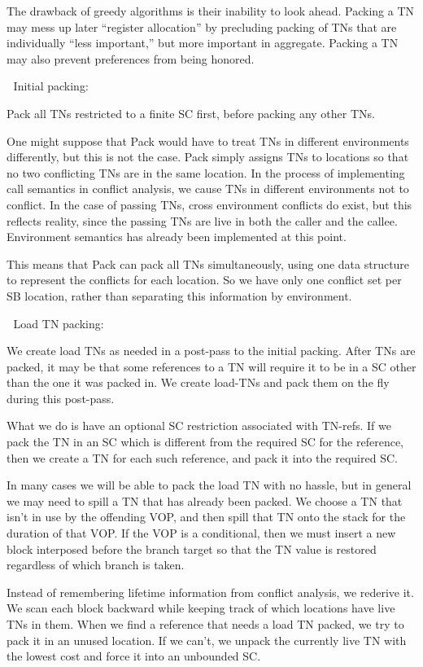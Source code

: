 The drawback of greedy algorithms is their inability to look ahead.  Packing a
TN may mess up later ``register allocation'' by precluding packing of TNs that
are individually ``less important,'' but more important in aggregate.  Packing a
TN may also prevent preferences from being honored.



Initial packing:


Pack all TNs restricted to a finite SC first, before packing any other TNs.

One might suppose that Pack would have to treat TNs in different environments
differently, but this is not the case.  Pack simply assigns TNs to locations so
that no two conflicting TNs are in the same location.  In the process of
implementing call semantics in conflict analysis, we cause TNs in different
environments not to conflict.  In the case of passing TNs, cross environment
conflicts do exist, but this reflects reality, since the passing TNs are
live in both the caller and the callee.  Environment semantics has already been
implemented at this point.

This means that Pack can pack all TNs simultaneously, using one data structure
to represent the conflicts for each location.  So we have only one conflict set
per SB location, rather than separating this information by environment.


Load TN packing:

We create load TNs as needed in a post-pass to the initial packing.  After TNs
are packed, it may be that some references to a TN will require it to be in a
SC other than the one it was packed in.  We create load-TNs and pack them on
the fly during this post-pass.  

What we do is have an optional SC restriction associated with TN-refs.  If we
pack the TN in an SC which is different from the required SC for the reference,
then we create a TN for each such reference, and pack it into the required SC.

In many cases we will be able to pack the load TN with no hassle, but in
general we may need to spill a TN that has already been packed.  We choose a
TN that isn't in use by the offending VOP, and then spill that TN onto the
stack for the duration of that VOP.  If the VOP is a conditional, then we must
insert a new block interposed before the branch target so that the TN
value is restored regardless of which branch is taken.

Instead of remembering lifetime information from conflict analysis, we rederive
it.  We scan each block backward while keeping track of which locations have
live TNs in them.  When we find a reference that needs a load TN packed, we try
to pack it in an unused location.  If we can't, we unpack the currently live TN
with the lowest cost and force it into an unbounded SC.

